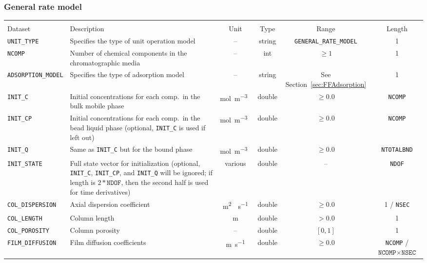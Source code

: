\FloatBarrier
\subsubsection{General rate model}

\begin{table}[!ht]
\footnotesize
\begin{tabu}to \linewidth[m]{lX[m]cccc} \toprule
{} \\
\rowfont[c]\normalfont Dataset & Description & Unit & Type & Range & Length \everyrow{\midrule}\\
\texttt{UNIT\_TYPE} & Specifies the type of unit operation model & -- & string & \texttt{GENERAL\_RATE\_MODEL} & 1 \\
\texttt{NCOMP}& Number of chemical components in the chromatographic media & -- & int  & $\geq 1$ & 1 \\
\texttt{ADSORPTION\_MODEL} & Specifies the type of adsorption model & -- & string & See Section~\ref{sec:FFAdsorption} & 1 \\
\texttt{INIT\_C} & Initial concentrations for each comp.\ in the bulk mobile phase & \si{\mol\per\cubic\metre{}} & double & $\geq 0.0$ & \texttt{NCOMP}\\
\texttt{INIT\_CP} & Initial concentrations for each comp.\ in the bead liquid phase (optional, \texttt{INIT\_C} is used if left out) & \si{\mol\per\cubic\metre{}} & double & $\geq 0.0$ & \texttt{NCOMP}\\
\texttt{INIT\_Q} & Same as \texttt{INIT\_C} but for the bound phase & \si{\mol\per\cubic\metre{}} & double & $\geq 0.0$ & \texttt{NTOTALBND}\\
\texttt{INIT\_STATE} & Full state vector for initialization (optional, \texttt{INIT\_C}, \texttt{INIT\_CP}, and \texttt{INIT\_Q} will be ignored; if length is $2 * \texttt{NDOF}$, then the second half is used for time derivatives) & various & double & -- & \texttt{NDOF} \\
\texttt{COL\_DISPERSION} & Axial dispersion coefficient & \si{\square\metre{}\per\second} & double & $\geq 0.0$ & 1 / \texttt{NSEC}\\
\texttt{COL\_LENGTH} & Column length & \si{\metre} & double & $> 0.0$ & 1\\
\texttt{COL\_POROSITY} & Column porosity & -- & double & $[0,1]$ & 1\\
\texttt{FILM\_DIFFUSION} & Film diffusion coefficients & \si{\metre\per\second} & double & $\geq 0.0$ & \texttt{NCOMP} / {$\texttt{NCOMP} \times \texttt{NSEC}$}\\

\end{tabu}
\end{table}
